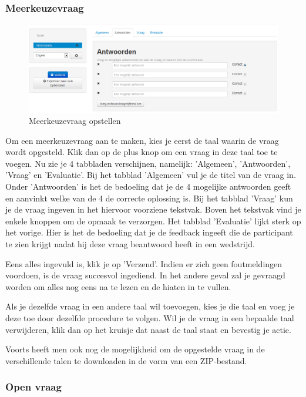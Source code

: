 \documentclass[]{article}
\begin{document}
\subsubsection{Meerkeuzevraag}

\begin{figure}[!ht]
	\centering
	\includegraphics[width=1\textwidth]{img/mcq}
	\caption{Meerkeuzevraag opstellen}
	\label{mcq}
\end{figure}

Om een meerkeuzevraag aan te maken, kies je eerst de taal waarin de vraag wordt opgesteld. Klik dan op de plus knop om een vraag in deze taal toe te voegen. Nu zie je 4 tabbladen verschijnen, namelijk: 'Algemeen', 'Antwoorden', 'Vraag' en 'Evaluatie'. Bij het tabblad 'Algemeen' vul je de titel van de vraag in. Onder 'Antwoorden' is het de bedoeling dat je de 4 mogelijke antwoorden geeft en aanvinkt welke van de 4 de correcte oplossing is. Bij het tabblad 'Vraag' kun je de vraag ingeven in het hiervoor voorziene tekstvak. Boven het tekstvak vind je enkele knoppen om de opmaak te verzorgen. Het tabblad 'Evaluatie' lijkt sterk op het vorige. Hier is het de bedoeling dat je de feedback ingeeft die de participant te zien krijgt nadat hij deze vraag beantwoord heeft in een wedstrijd. 

Eens alles ingevuld is, klik je op 'Verzend'. Indien er zich geen foutmeldingen voordoen, is de vraag succesvol ingediend. In het andere geval zal je gevraagd worden om alles nog eens na te lezen en de hiaten in te vullen.

Als je dezelfde vraag in een andere taal wil toevoegen, kies je die taal en voeg je deze toe door dezelfde procedure te volgen. Wil je de vraag in een bepaalde taal verwijderen, klik dan op het kruisje dat naast de taal staat en bevestig je actie. 

Voorts heeft men ook nog de mogelijkheid om de opgestelde vraag in de verschillende talen te downloaden in de vorm van een ZIP-bestand. 

\subsubsection{Open vraag}
\end{document}
